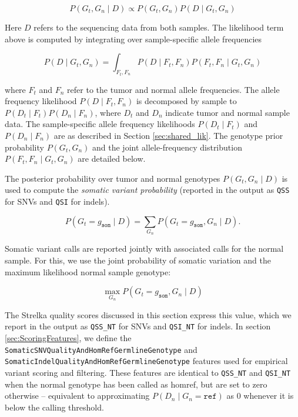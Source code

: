 \documentclass{article}
\begin{document}
\begin{equation*}
P(G_t,G_n \mid D) \propto P(G_t,G_n) P(D \mid G_t,G_n)
\end{equation*}


Here $D$ refers to the sequencing data from both samples. The likelihood term above is computed by integrating over sample-specific allele frequencies

\begin{equation*}
P(D \mid G_t,G_n) = \int_{F_t,F_n}{P(D \mid F_t,F_n)P(F_t,F_n \mid G_t,G_n)}
\end{equation*}

\noindent where $F_t$ and $F_n$ refer to the tumor and normal allele frequencies. The allele frequency likelihood $P(D \mid F_t,F_n)$ is decomposed by sample to $P(D_t \mid F_t)P(D_n \mid F_n)$, where $D_t$ and $D_n$ indicate tumor and normal sample data. The sample-specific allele frequency likelihoods $P(D_t \mid F_t)$ and $P(D_n \mid F_n)$ are as described in Section \ref{sec:shared_lik}. The genotype prior probability $P(G_t, G_n)$ and the joint allele-frequency distribution $P(F_t,F_n \mid G_t,G_n)$ are detailed below.

The posterior probability over tumor and normal genotypes $P(G_t,G_n \mid D)$ is used to compute the {\em somatic variant probability} (reported in the output as \texttt{QSS} for SNVs and \texttt{QSI} for indels).

\begin{equation}
\label{eq:somVarProb}
	P(G_t = g_\texttt{som} \mid D) = \sum_{G_n}{P(G_t=g_\texttt{som},G_n \mid D)}.
\end{equation}

Somatic variant calls are reported jointly with associated calls for the normal sample. For this, we use the joint probability of somatic variation and the maximum likelihood normal sample genotype:

\begin{equation*}
\max_{G_n} P(G_t = g_\texttt{som}, G_n \mid D)
\end{equation*}

The Strelka quality scores discussed in this section express this value, which we report in the output as \texttt{QSS\_NT} for SNVs and \texttt{QSI\_NT} for indels. In section \ref{sec:ScoringFeatures}, we define the \texttt{SomaticSNVQualityAndHomRefGermlineGenotype} and \texttt{SomaticIndelQualityAndHomRefGermlineGenotype} features used for empirical variant scoring and filtering. These features are identical to \texttt{QSS\_NT} and \texttt{QSI\_NT} when the normal genotype has been called as homref, but are set to zero otherwise -- equivalent to approximating $P(D_n \mid G_n = \texttt{ref})$ as $0$ whenever it is below the calling threshold.
\end{document}
